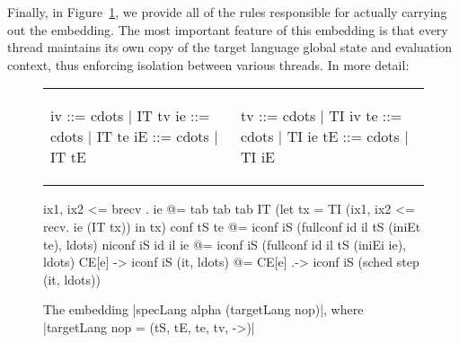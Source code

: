 Finally, in Figure~\ref{fig:embedding},
we provide all of the rules responsible for actually carrying out the embedding.
The most important feature of this embedding is that every thread maintains its own
copy of the target language global state and evaluation context, thus
enforcing isolation between various threads.  In more detail:

\begin{figure}
\begin{tabular}{ll}
\begin{minipage}{.22\textwidth}
\begin{code}
iv  ::= cdots | IT tv
ie  ::= cdots | IT te
iE  ::= cdots | IT tE
\end{code}
\end{minipage} &
\begin{minipage}{.22\textwidth}
\begin{code}
tv  ::= cdots | TI iv
te  ::= cdots | TI ie
tE  ::= cdots | TI iE
\end{code}
\end{minipage}
\end{tabular}

\begin{code}
ix1, ix2 <= brecv . ie @=
tab tab tab IT (let tx = TI (ix1, ix2 <= recv. ie  (IT tx)) in tx)
conf tS te @= iconf iS (fullconf id il tS (iniEt te), ldots)
niconf iS id il ie @= iconf iS (fullconf id il tS (iniEi ie), ldots)
CE[e] -> iconf iS (it, ldots) @= CE[e] .-> iconf iS (sched step (it, ldots))
\end{code}

\caption{The embedding |specLang alpha (targetLang nop)|, where
|targetLang nop = (tS, tE, te, tv, ->)|}
\label{fig:embedding}
\end{figure}

